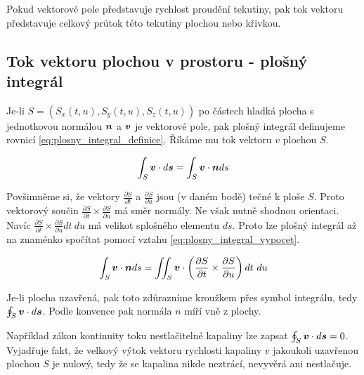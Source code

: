 Pokud vektorové pole představuje rychlost proudění tekutiny, pak tok vektoru představuje celkový průtok této tekutiny plochou nebo křivkou.

\subsection{Tok vektoru plochou v prostoru - plošný integrál}

Je-li \(S = \left(S_x(t, u), S_y(t, u), S_z(t, u)\right)\) po částech hladká plocha s jednotkovou normálou \(\boldsymbol{n}\) a \(\boldsymbol{v}\) je vektorové pole,
pak plošný integrál definujeme rovnicí \eqref{eq:plosny_integral_definice}. Říkáme mu tok vektoru \(v\) plochou \(S\).


\begin{equation}
\label{eq:plosny_integral_definice}
\begin{split}
\int_S \boldsymbol{v} \cdot d\boldsymbol{s} = \int_S \boldsymbol{v} \cdot \boldsymbol{n} ds
\end{split}
\end{equation}


Povšimněme si, že vektory \(\frac{\partial S}{\partial t}\) a \(\frac{\partial S}{\partial u}\) jsou (v daném bodě) tečné k ploše \(S\). Proto vektorový součin \(\frac{\partial S}{\partial t} \times \frac{\partial S}{\partial u}\) má směr normály. Ne však nutně shodnou orientaci. Navíc \(\frac{\partial S}{\partial t} \times \frac{\partial S}{\partial u} dt \ du\) má velikot splošného elementu \(ds\). Proto lze plošný integrál až na znaménko spočítat pomocí vztahu \eqref{eq:plosny_integral_vypocet}.

\begin{equation}
\label{eq:plosny_integral_vypocet}
\begin{split}
\int_S \boldsymbol{v} \cdot \boldsymbol{n} ds = \iint_S \boldsymbol{v} \cdot \left (\frac{\partial S}{\partial t} \times \frac{\partial S}{\partial u}\right) dt \ du
\end{split}
\end{equation}

Je-li plocha uzavřená, pak toto zdůrazníme kroužkem přes symbol integrálu, tedy \(\oint_S \boldsymbol{v} \cdot d\boldsymbol{s}\). Podle konvence pak normála \(n\) míří vně z plochy.

Například zákon kontinuity toku nestlačitelné kapaliny lze zapsat \(\oint_S \boldsymbol{v} \cdot d\boldsymbol{s} = 0\). Vyjadřuje fakt, že velkový výtok vektoru rychlosti kapaliny \(v\) jakoukoli uzavřenou plochou \(S\) je nulový, tedy že se kapalina nikde neztrácí, nevyvěrá ani nestlačuje. 

